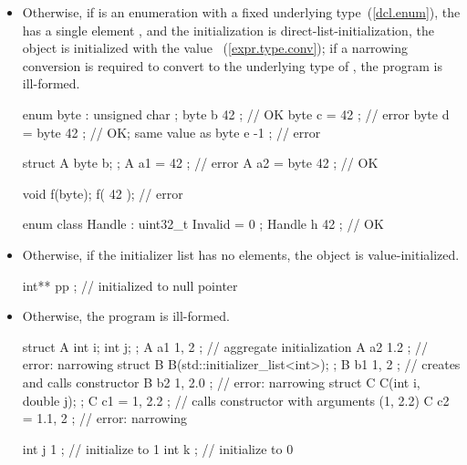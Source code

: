 \begin{itemize}
\item Otherwise, if  is an enumeration
with a fixed underlying type~(\ref{dcl.enum}),
the  has a single element , and
the initialization is direct-list-initialization,
the object is initialized with the value ~(\ref{expr.type.conv});
if a narrowing conversion is required to convert 
to the underlying type of , the program is ill-formed.

\begin{example}
\begin{codeblock}
enum byte : unsigned char { };
byte b { 42 };                      // OK
byte c = { 42 };                    // error
byte d = byte{ 42 };                // OK; same value as 
byte e { -1 };                      // error

struct A { byte b; };
A a1 = { { 42 } };                  // error
A a2 = { byte{ 42 } };              // OK

void f(byte);
f({ 42 });                          // error

enum class Handle : uint32_t { Invalid = 0 };
Handle h { 42 };                    // OK
\end{codeblock}
\end{example}

\item Otherwise, if the initializer list has no elements, the object is
value-initialized.

\begin{example}
\begin{codeblock}
int** pp {};                        // initialized to null pointer
\end{codeblock}
\end{example}

\item Otherwise, the program is ill-formed.

\begin{example}
\begin{codeblock}
struct A { int i; int j; };
A a1 { 1, 2 };                      // aggregate initialization 
A a2 { 1.2 };                       // error: narrowing
struct B {
  B(std::initializer_list<int>);
};
B b1 { 1, 2 };                      // creates  and calls constructor
B b2 { 1, 2.0 };                    // error: narrowing
struct C {
  C(int i, double j);
};
C c1 = { 1, 2.2 };                  // calls constructor with arguments (1, 2.2) 
C c2 = { 1.1, 2 };                  // error: narrowing

int j { 1 };                        // initialize to 1
int k { };                          // initialize to 0
\end{codeblock}
\end{example}

\end{itemize}

